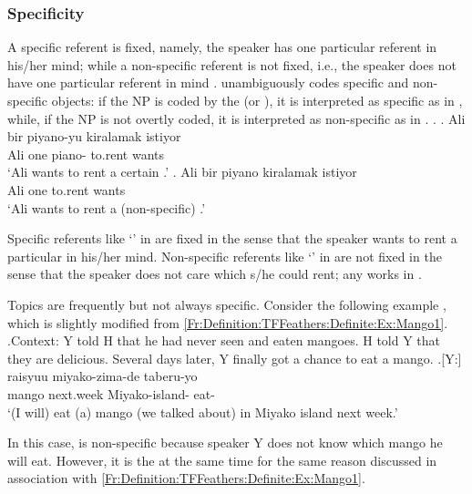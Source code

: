 \subsubsection{Specificity}

A specific referent is fixed, namely, the speaker has one particular referent in his/her mind;
while a non-specific referent is not fixed,
i.e., the speaker does not have one particular referent in mind \cite{karttunen69diss,enc91,abbott94}.
 unambiguously codes specific and non-specific objects:
if the NP is coded by the    (or ),
it is interpreted as specific as in \Next[a],
while, if the NP is not overtly coded,
it is interpreted as non-specific as in \Next[b].
\ex. \ag. Ali bir piyano-yu kiralamak istiyor \\
	Ali one piano- to.rent wants \\
	`Ali wants to rent a certain .'
	\bg. Ali bir piyano kiralamak istiyor \\
	Ali one  to.rent wants \\
	`Ali wants to rent a (non-specific) .'
	\hfill{\cite[][p.\ 4-5]{enc91}}

Specific referents like `' in \Last[a] are fixed
in the sense that
the speaker wants to rent a particular  in his/her mind.
Non-specific referents like `' in \Last[b] are not fixed
in the sense that
the speaker does not care which  s/he could rent;
any  works in \Last[b].

Topics are frequently but not always specific.
Consider the following example \Next,
which is slightly modified from \ref{Fr:Definition:TFFeathers:Definite:Ex:Mango1}.
%
\ex.\label{Fr:Definition:TFFeathers:Specificity:Mango}Context:
	Y told H that he had never seen and eaten mangoes.
	H told Y that they are delicious.
	Several days later, Y finally got a chance to eat a mango.
	\ag.[Y:]  raisyuu miyako-zima-de taberu-yo \\
			mango next.week Miyako-island- eat- \\
			`(I will) eat (a) mango (we talked about) in Miyako island next week.'

In this case,  is non-specific because speaker Y does not know which mango he will eat.
However, it is the  at the same time for the same reason discussed in association with \ref{Fr:Definition:TFFeathers:Definite:Ex:Mango1}.

